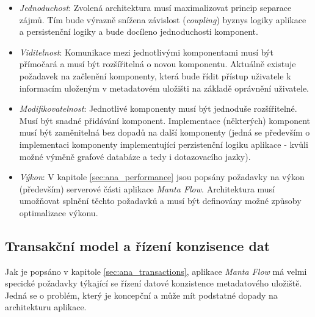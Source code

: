 \begin{itemize}
   \item{\textit{Jednoduchost}}: Zvolená architektura musí maximalizovat princip separace zájmů. Tím bude výrazně snížena závislost (\textit{coupling}) byznys logiky aplikace a persistenční logiky a bude docíleno jednoduchosti komponent.
   \item{\textit{Viditelnost}}: Komunikace mezi jednotlivými komponentami musí být přímočará a musí být rozšířitelná o novou komponentu. Aktuálně existuje požadavek na začlenění komponenty, která bude řídit přístup uživatele k informacím uloženým v metadatovém uložišti na základě oprávnění uživatele.
   \item{\textit{Modifikovatelnost}}: Jednotlivé komponenty musí být jednoduše rozšířitelné. Musí být snadné přidávání komponent. Implementace (některých) komponent musí být zaměnitelná bez dopadů na další komponenty (jedná se především o implementaci komponenty implementující perzistenční logiku aplikace - kvůli možné výměně grafové databáze a tedy i dotazovacího jazky).
   \item{\textit{Výkon}}: V kapitole \ref{sec:ana_performance} jsou popsány požadavky na výkon (především) serverové části aplikace \textit{Manta Flow}. Architektura musí umožňovat splnění těchto požadavků a musí být definovány možné způsoby optimalizace výkonu.
\end{itemize}

\subsection{Transakční model a řízení konzisence dat}
\label{sec:des_transactions}
Jak je popsáno v kapitole \ref{sec:ana_transactions}, aplikace \textit{Manta Flow} má velmi specické požadavky týkající se řízení datové konzistence metadatového uložiště. Jedná se o problém, který je koncepční a může mít podstatné dopady na architekturu aplikace.

